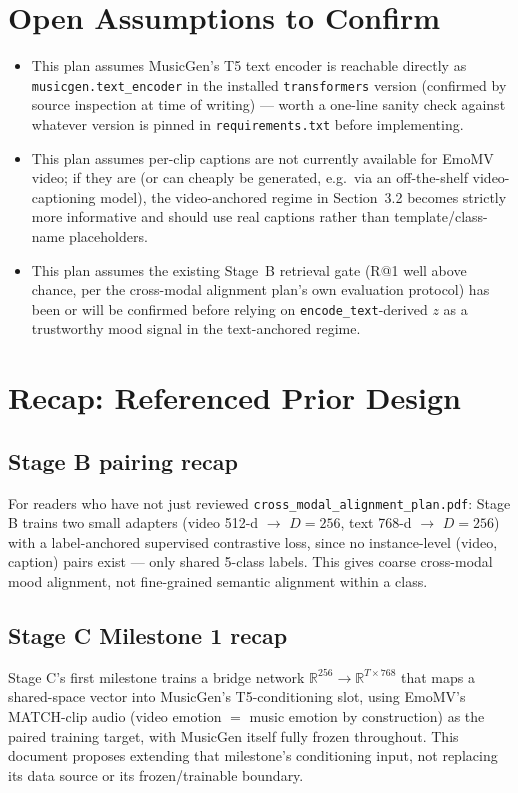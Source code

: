 \documentclass[11pt]{article}
\begin{document}
\section*{Open Assumptions to Confirm}
\begin{itemize}
\item This plan assumes MusicGen's T5 text encoder is reachable directly as
\texttt{musicgen.text\_encoder} in the installed \texttt{transformers} version (confirmed by
source inspection at time of writing) --- worth a one-line sanity check against whatever version
is pinned in \texttt{requirements.txt} before implementing.
\item This plan assumes per-clip captions are not currently available for EmoMV video; if they
are (or can cheaply be generated, e.g.\ via an off-the-shelf video-captioning model), the
video-anchored regime in Section~3.2 becomes strictly more informative and should use real
captions rather than template/class-name placeholders.
\item This plan assumes the existing Stage~B retrieval gate (R@1 well above chance, per the
cross-modal alignment plan's own evaluation protocol) has been or will be confirmed before relying
on \texttt{encode\_text}-derived $z$ as a trustworthy mood signal in the text-anchored regime.
\end{itemize}

\section*{Recap: Referenced Prior Design}
\label{sec:pairing-recap}
\subsection*{Stage B pairing recap}
\label{sec:pairing-recap-detail}
For readers who have not just reviewed \texttt{cross\_modal\_alignment\_plan.pdf}: Stage B trains
two small adapters (video 512-d $\to$ $D{=}256$, text 768-d $\to$ $D{=}256$) with a label-anchored
supervised contrastive loss, since no instance-level (video, caption) pairs exist --- only shared
5-class labels. This gives coarse cross-modal mood alignment, not fine-grained semantic alignment
within a class.

\subsection*{Stage C Milestone 1 recap}
\label{sec:musicgen-recap}
Stage C's first milestone trains a bridge network
$\mathbb{R}^{256} \to \mathbb{R}^{T \times 768}$ that maps a shared-space vector into MusicGen's
T5-conditioning slot, using EmoMV's MATCH-clip audio (video emotion $=$ music emotion by
construction) as the paired training target, with MusicGen itself fully frozen throughout. This
document proposes extending that milestone's conditioning input, not replacing its data source or
its frozen/trainable boundary.
\end{document}

